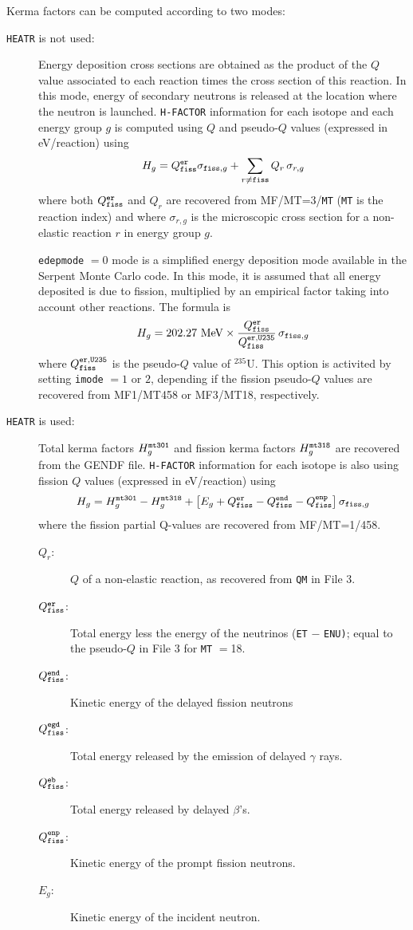 Kerma factors can be computed according to two modes:
\begin{description}
\item[{\tt HEATR} is not used:] Energy deposition cross sections are obtained
as the product of the $Q$ value associated to each reaction times the cross
section of this reaction. In this mode, energy of secondary neutrons is
released at the location where the neutron is launched. {\tt H-FACTOR}
information for each isotope and each energy group $g$ is computed using $Q$
and pseudo-$Q$ values (expressed in eV/reaction) using
\vspace{-0.04cm}
$$
H_g=Q_{\tt fiss}^{\tt er} \sigma_{{\tt fiss},g} + \sum_{r\neq {\tt fiss}} Q_r
\, \sigma_{r,g}
$$
\noindent where both $Q_{\tt fiss}^{\tt er}$ and $Q_r$ are recovered from
MF/MT=3/{\tt MT} ({\tt MT} is the reaction index) and where $\sigma_{r,g}$ is
the microscopic cross section for a non-elastic reaction $r$ in energy group
$g$.

{\tt edepmode} $=0$ mode is a simplified energy deposition mode available in
the Serpent Monte Carlo code.
In this mode, it is assumed that all energy deposited is due to fission,
multiplied
by an empirical factor taking into account other reactions. The formula is
$$
H_g=202.27 \ {\rm MeV}\times {Q_{\tt fiss}^{\tt er}\over
Q_{\tt fiss}^{\tt er,U235}} \, \sigma_{{\tt fiss},g}
$$
\noindent where $Q_{\tt fiss}^{\tt er,U235}$ is the pseudo-$Q$ value of
$^{235}$U. This option is activited by setting {\tt imode} $=1$ or $2$,
depending if the fission pseudo-$Q$ values are recovered from MF1/MT458 or
MF3/MT18, respectively.

\item[{\tt HEATR} is used:] Total kerma factors $H_g^{\tt mt301}$ and fission
kerma factors $H_g^{\tt mt318}$ are recovered from the GENDF file.
{\tt H-FACTOR} information for each isotope is also using fission $Q$ values
(expressed in eV/reaction) using
\vspace{-0.1cm}
$$
H_g=H_g^{\tt mt301}-H_g^{\tt mt318}+\left[E_g+Q_{\tt fiss}^{\tt er} -
Q_{\tt fiss}^{\tt end}-Q_{\tt fiss}^{\tt enp}\right] \sigma_{{\tt fiss},g}
$$
\noindent where the fission partial Q-values are recovered from MF/MT=1/458.
\begin{description}
\item[$Q_r $:] $Q$ of a non-elastic reaction, as recovered from {\tt QM} in
File 3.
\item[$Q_{\tt fiss}^{\tt er}$:] Total energy less the energy of the neutrinos
({\tt ET} $-$ {\tt ENU)}; equal to the pseudo-$Q$ in File 3 for {\tt MT} $=$18.
\item[$Q_{\tt fiss}^{\tt end}$:] Kinetic energy of the delayed fission neutrons
\item[$Q_{\tt fiss}^{\tt egd}$:] Total energy released by the emission of
delayed $\gamma$ rays.
\item[$Q_{\tt fiss}^{\tt eb}$:] Total energy released by delayed $\beta$'s.
\item[$Q_{\tt fiss}^{\tt enp}$:] Kinetic energy of the prompt fission neutrons.
\item[$E_g$:] Kinetic energy of the incident neutron.
\end{description}
\end{description}

